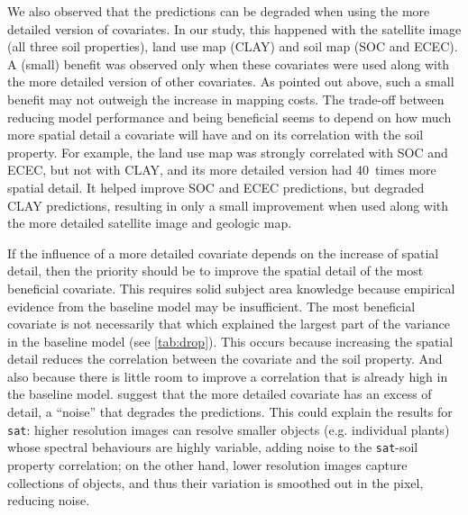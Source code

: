 We also observed that the predictions can be degraded when using the more 
detailed version of covariates. In our study, this happened with the satellite 
image (all three soil properties), land use map (CLAY) and soil map (SOC and 
ECEC). A (small) benefit was observed only when these covariates were used 
along with the more detailed version of other covariates. As pointed out above,
such a small benefit may not outweigh the increase in mapping costs. The 
trade-off between reducing model performance and being beneficial seems to 
depend on how much more spatial detail a covariate will have and on its 
correlation with the soil property. For example, the land use map was strongly 
correlated with SOC and ECEC, but not with CLAY, and its more detailed version 
had 40~times more spatial detail. It helped improve SOC and ECEC predictions, 
but degraded CLAY predictions, resulting in only a small improvement when used
along with the more detailed satellite image and geologic map.

If the influence of a more detailed covariate depends on the increase of 
spatial detail, then the priority should be to improve the spatial detail of 
the most beneficial covariate. This requires solid subject area knowledge 
because empirical evidence from the baseline model may be insufficient. The 
most beneficial covariate is not necessarily that which explained the largest 
part of the variance in the baseline model (see \autoref{tab:drop}). This occurs
because increasing the spatial detail reduces the correlation between the 
covariate and the soil property. And also because there is little room to 
improve a correlation that is already high in the baseline model. 
\citet{CavazziEtAl2013} suggest that the more detailed covariate has an excess 
of detail, a ``noise'' that degrades the predictions. This could explain the 
results for \texttt{sat}: higher resolution images can resolve smaller objects
(e.g. individual plants) whose spectral behaviours are highly variable, adding
noise to the \texttt{sat}-soil property correlation; on the other hand, lower 
resolution images capture collections of objects, and thus their variation is 
smoothed out in the pixel, reducing noise.

